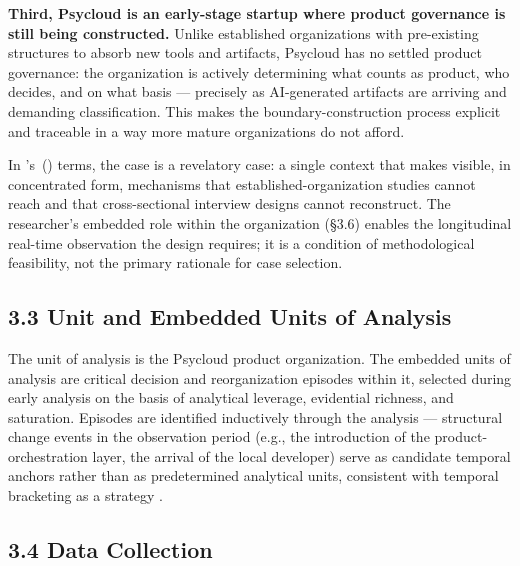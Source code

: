 \documentclass[11pt,a4paper]{article}
\newcommand{\citepos}[1]{\citeauthor{#1}'s~(\citeyear{#1})}
\begin{document}
\textbf{Third, Psycloud is an early-stage startup where product governance is still being constructed.} Unlike established organizations with pre-existing structures to absorb new tools and artifacts, Psycloud has no settled product governance: the organization is actively determining what counts as product, who decides, and on what basis --- precisely as AI-generated artifacts are arriving and demanding classification. This makes the boundary-construction process explicit and traceable in a way more mature organizations do not afford.

In \citepos{yin2018case} terms, the case is a revelatory case: a single context that makes visible, in concentrated form, mechanisms that established-organization studies cannot reach and that cross-sectional interview designs cannot reconstruct. The researcher's embedded role within the organization (§3.6) enables the longitudinal real-time observation the design requires; it is a condition of methodological feasibility, not the primary rationale for case selection.

\subsection*{3.3 Unit and Embedded Units of Analysis}

The unit of analysis is the Psycloud product organization. The embedded units of analysis are critical decision and reorganization episodes within it, selected during early analysis on the basis of analytical leverage, evidential richness, and saturation. Episodes are identified inductively through the analysis --- structural change events in the observation period (e.g., the introduction of the product-orchestration layer, the arrival of the local developer) serve as candidate temporal anchors rather than as predetermined analytical units, consistent with temporal bracketing as a strategy \citep{langley1999strategies}.


\subsection*{3.4 Data Collection}

\end{document}
